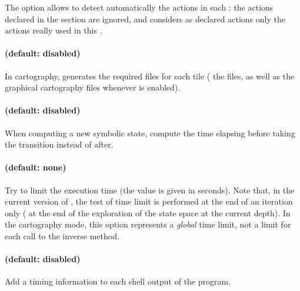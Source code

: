 The option  allows to detect automatically the actions in each \IPTA{}: the actions declared in the  section are ignored, and \imitator{} considers as declared actions only the actions really used in this \IPTA{}.



\paragraph{ (default: disabled)}
In cartography, generates the required files for each tile (\ie{} the  files, as well as the graphical cartography files whenever  is enabled).



\paragraph{ (default: disabled)}
When computing a new symbolic state, compute the time elapsing before taking the transition instead of after.




\paragraph{ (default: none)}
Try to limit the execution time (the value  is given in seconds).
Note that, in the current version of \imitator{}, the test of time limit is performed at the end of an iteration only (\ie{} at the end of the exploration of the state space at the current depth).
In the cartography mode, this option represents a \emph{global} time limit, not a limit for each call to the inverse method.


\paragraph{ (default: disabled)}
Add a timing information to each shell output of the program.






